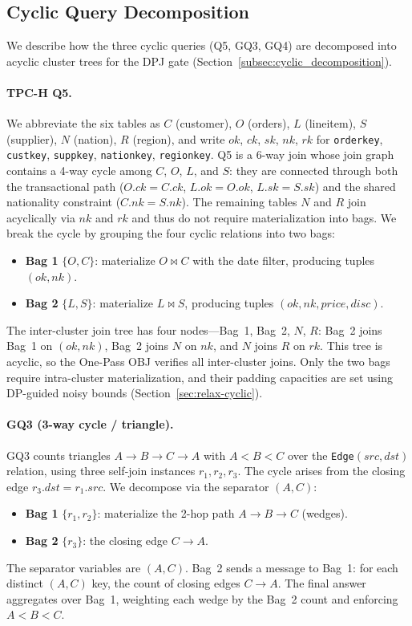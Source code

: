 \documentclass[sigconf]{acmart}
\begin{document}
\subsection{Cyclic Query Decomposition}
\label{app:cyclic_decomposition}

We describe how the three cyclic queries (Q5, GQ3, GQ4) are decomposed into acyclic cluster trees for the DPJ gate (Section~\ref{subsec:cyclic_decomposition}).

\paragraph{TPC-H Q5.}
We abbreviate the six tables as $C$ (customer), $O$ (orders), $L$ (lineitem), $S$ (supplier), $N$ (nation), $R$ (region), and write $ok$, $ck$, $sk$, $nk$, $rk$ for \texttt{orderkey}, \texttt{custkey}, \texttt{suppkey}, \texttt{nationkey}, \texttt{regionkey}.
Q5 is a 6-way join whose join graph contains a 4-way cycle among $C$, $O$, $L$, and $S$: they are connected through both the transactional path ($O.ck{=}C.ck$, $L.ok{=}O.ok$, $L.sk{=}S.sk$) and the shared nationality constraint ($C.nk{=}S.nk$). The remaining tables $N$ and $R$ join acyclically via $nk$ and $rk$ and thus do not require materialization into bags. We break the cycle by grouping the four cyclic relations into two bags:
\begin{itemize}[leftmargin=*, itemsep=0.1em]
    \item \textbf{Bag 1} $\{O, C\}$: materialize $O \bowtie C$ with the date filter, producing tuples $(ok, nk)$.
    \item \textbf{Bag 2} $\{L, S\}$: materialize $L \bowtie S$, producing tuples $(ok, nk, \mathit{price}, \mathit{disc})$.
\end{itemize}
The inter-cluster join tree has four nodes---Bag~1, Bag~2, $N$, $R$: Bag~2 joins Bag~1 on $(ok, nk)$, Bag~2 joins $N$ on $nk$, and $N$ joins $R$ on $rk$. This tree is acyclic, so the One-Pass OBJ verifies all inter-cluster joins. Only the two bags require intra-cluster materialization, and their padding capacities are set using DP-guided noisy bounds (Section~\ref{sec:relax-cyclic}).

\paragraph{GQ3 (3-way cycle / triangle).}
GQ3 counts triangles $A \to B \to C \to A$ with $A < B < C$ over the \texttt{Edge}$(src, dst)$ relation, using three self-join instances $r_1, r_2, r_3$. The cycle arises from the closing edge $r_3.dst = r_1.src$. We decompose via the separator $(A, C)$:
\begin{itemize}[leftmargin=*, itemsep=0.1em]
    \item \textbf{Bag 1} $\{r_1, r_2\}$: materialize the 2-hop path $A \to B \to C$ (wedges).
    \item \textbf{Bag 2} $\{r_3\}$: the closing edge $C \to A$.
\end{itemize}
The separator variables are $(A, C)$. Bag~2 sends a message to Bag~1: for each distinct $(A, C)$ key, the count of closing edges $C \to A$. The final answer aggregates over Bag~1, weighting each wedge by the Bag~2 count and enforcing $A < B < C$.
\end{document}
